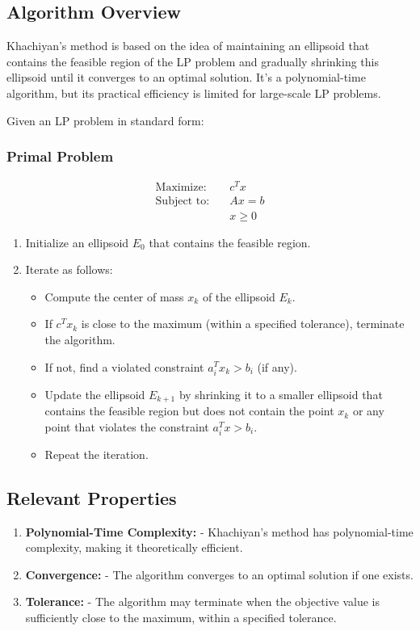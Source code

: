 \documentclass[a4paper]{article}
\begin{document}
\subsection{Algorithm Overview}

Khachiyan's method is based on the idea of maintaining an ellipsoid that contains the feasible region of the LP problem and gradually shrinking this ellipsoid until it converges to an optimal solution. It's a polynomial-time algorithm, but its practical efficiency is limited for large-scale LP problems.

Given an LP problem in standard form:

\subsubsection{Primal Problem}
\begin{align*}
\text{Maximize:} \quad & c^Tx \\
\text{Subject to:} \quad & Ax = b \\
& x \geq 0
\end{align*}

\begin{enumerate}
\item Initialize an ellipsoid \(E_0\) that contains the feasible region.
\item Iterate as follows:
   \begin{itemize}
   \item Compute the center of mass \(x_k\) of the ellipsoid \(E_k\).
   \item If \(c^Tx_k\) is close to the maximum (within a specified tolerance), terminate the algorithm.
   \item If not, find a violated constraint \(a_i^Tx_k > b_i\) (if any).
   \item Update the ellipsoid \(E_{k+1}\) by shrinking it to a smaller ellipsoid that contains the feasible region but does not contain the point \(x_k\) or any point that violates the constraint \(a_i^Tx > b_i\).
   \item Repeat the iteration.
   \end{itemize}
\end{enumerate}

\subsection{Relevant Properties}

\begin{enumerate}
\item \textbf{Polynomial-Time Complexity:}
   - Khachiyan's method has polynomial-time complexity, making it theoretically efficient.

\item \textbf{Convergence:}
   - The algorithm converges to an optimal solution if one exists.

\item \textbf{Tolerance:}
   - The algorithm may terminate when the objective value is sufficiently close to the maximum, within a specified tolerance.
\end{enumerate}
\end{document}

